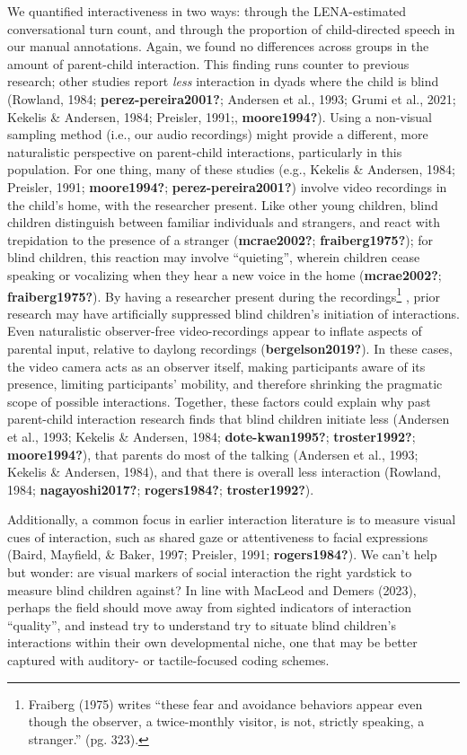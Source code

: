 \documentclass[
  man,floatsintext]{apa6}
\begin{document}
We quantified interactiveness in two ways: through the LENA-estimated conversational turn count, and through the proportion of child-directed speech in our manual annotations. Again, we found no differences across groups in the amount of parent-child interaction. This finding runs counter to previous research; other studies report \emph{less} interaction in dyads where the child is blind (Rowland, 1984; \textbf{perez-pereira2001?}; Andersen et al., 1993; Grumi et al., 2021; Kekelis \& Andersen, 1984; Preisler, 1991;, \textbf{moore1994?}). Using a non-visual sampling method (i.e., our audio recordings) might provide a different, more naturalistic perspective on parent-child interactions, particularly in this population. For one thing, many of these studies (e.g., Kekelis \& Andersen, 1984; Preisler, 1991; \textbf{moore1994?}; \textbf{perez-pereira2001?}) involve video recordings in the child's home, with the researcher present. Like other young children, blind children distinguish between familiar individuals and strangers, and react with trepidation to the presence of a stranger (\textbf{mcrae2002?}; \textbf{fraiberg1975?}); for blind children, this reaction may involve ``quieting'', wherein children cease speaking or vocalizing when they hear a new voice in the home (\textbf{mcrae2002?}; \textbf{fraiberg1975?}). By having a researcher present during the recordings\footnote{Fraiberg (1975) writes ``these fear and avoidance behaviors appear even though the observer, a twice-monthly visitor, is not, strictly speaking, a stranger.'' (pg. 323).} , prior research may have artificially suppressed blind children's initiation of interactions. Even naturalistic observer-free video-recordings appear to inflate aspects of parental input, relative to daylong recordings (\textbf{bergelson2019?}). In these cases, the video camera acts as an observer itself, making participants aware of its presence, limiting participants' mobility, and therefore shrinking the pragmatic scope of possible interactions. Together, these factors could explain why past parent-child interaction research finds that blind children initiate less (Andersen et al., 1993; Kekelis \& Andersen, 1984; \textbf{dote-kwan1995?}; \textbf{troster1992?}; \textbf{moore1994?}), that parents do most of the talking (Andersen et al., 1993; Kekelis \& Andersen, 1984), and that there is overall less interaction (Rowland, 1984; \textbf{nagayoshi2017?}; \textbf{rogers1984?}; \textbf{troster1992?}).

Additionally, a common focus in earlier interaction literature is to measure visual cues of interaction, such as shared gaze or attentiveness to facial expressions (Baird, Mayfield, \& Baker, 1997; Preisler, 1991; \textbf{rogers1984?}). We can't help but wonder: are visual markers of social interaction the right yardstick to measure blind children against? In line with MacLeod and Demers (2023), perhaps the field should move away from sighted indicators of interaction ``quality'', and instead try to understand try to situate blind children's interactions within their own developmental niche, one that may be better captured with auditory- or tactile-focused coding schemes.
\end{document}
